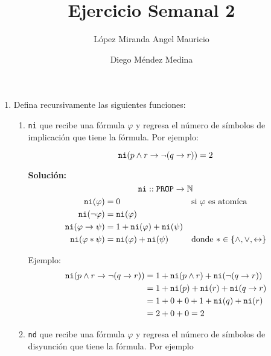 \documentclass[8pt, letterpaper]{article}
\title{%
  Ejercicio Semanal 2\\
  {\large{}}}
\author{López Miranda Angel Mauricio\and Diego Méndez Medina}
\date{}
\begin{document}
\ttfamily
\maketitle
\rmfamily
\begin{enumerate}
\item Defina recursivamente las siguientes funciones:

  \begin{enumerate}

  \item {\tt ni} que recibe una fórmula $\varphi$ y regresa el número
    de símbolos de implicación que tiene la fórmula. Por ejemplo:

    $${\tt ni} (p \land r \to \lnot (q \to r)) = 2$$

    \ttfamily
    {\bf Solución:}
    \hfill\break
    $${\tt ni} :: {\tt PROP} \rightarrow \mathbb{N}$$
    \begin{align*} 
      {\tt ni}(\varphi) &= 0 & &\text{si $\varphi$ es atomíca}\\
      {\tt ni}(\neg\varphi) &= {\tt ni}(\varphi) \\
      {\tt ni}(\varphi \rightarrow \psi) &= 1 + {\tt ni}(\varphi) +
      {\tt ni}(\psi) \\
      {\tt ni}(\varphi * \psi) &= {\tt ni}(\varphi) + {\tt ni}(\psi) &
      &\text{donde $*$} \in\{\land, \lor, \leftrightarrow\}\\
    \end{align*}

    Ejemplo:
    \begin{align*}
      {\tt ni} (p \land r \to \lnot (q \to r)) &= 1 +
      {\tt ni} (p \land r) +  {\tt ni}(\lnot (q \to r)) \\
      &= 1 + {\tt ni}(p) +  {\tt ni}(r) +  {\tt ni}(q \to r) \\
      &= 1 + 0 +  0 +  1+ {\tt ni}(q) + {\tt ni}(r) \\
      &= 2 + 0 + 0 = 2
    \end{align*}
    \rmfamily

  \item {\tt nd} que recibe una fórmula $\varphi$ y regresa el número de
    símbolos de disyunción que tiene la fórmula. Por ejemplo


\end{enumerate}
\end{enumerate}
\end{document}
